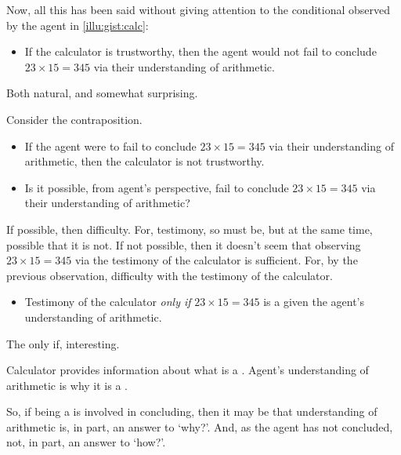\begin{note}
  Now, all this has been said without giving attention to the conditional observed by the agent in \autoref{illu:gist:calc}:

  \begin{itemize}
  \item
    If the calculator is trustworthy, then the agent would not fail to conclude \(23 \times 15 = 345\) via their understanding of arithmetic.
  \end{itemize}

  Both natural, and somewhat surprising.

  Consider the contraposition.

  \begin{itemize}
  \item
    If the agent were to fail to conclude \(23 \times 15 = 345\) via their understanding of arithmetic, then the calculator is not trustworthy.
  \end{itemize}

  \begin{itemize}
  \item
    Is it possible, from agent's perspective, fail to conclude \(23 \times 15 = 345\) via their understanding of arithmetic?
  \end{itemize}

  If possible, then difficulty.
  For, testimony, so must be, but at the same time, possible that it is not.
  If not possible, then it doesn't seem that observing \(23 \times 15 = 345\) via the testimony of the calculator is sufficient.
  For, by the previous observation, difficulty with the testimony of the calculator.

  \begin{itemize}
  \item
    Testimony of the calculator \emph{only if} \(23 \times 15 = 345\) is a  given the agent's understanding of arithmetic.
  \end{itemize}
\end{note}

\begin{note}
  The only if, interesting.

  Calculator provides information about what is a \fc{}.
  Agent's understanding of arithmetic is why it is a \fc{}.

  So, if being a  is involved in concluding, then it may be that understanding of arithmetic is, in part, an answer to `why?'.
  And, as the agent has not concluded, not, in part, an answer to `how?'.
\end{note}

